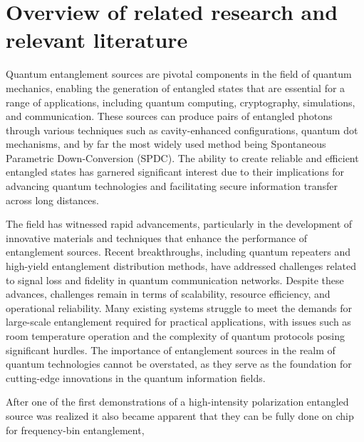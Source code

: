 \documentclass{article}
\theoremstyle{mytheoremstyle}
\theoremstyle{mytheoremstyle}
\theoremstyle{myproblemstyle}
\begin{document}
\section{Overview of related research and relevant literature}
Quantum entanglement sources are pivotal components in the field of quantum mechanics, enabling the generation of entangled states
that are essential for a range of applications, including quantum computing, cryptography, simulations, and communication.
These sources can produce pairs of entangled photons through various techniques such as cavity-enhanced configurations,
quantum dot mechanisms, and by far the most widely used method being Spontaneous Parametric Down-Conversion (SPDC).
The ability to create reliable and efficient entangled states has garnered significant interest due to their
implications for advancing quantum technologies and facilitating secure information transfer across long distances.
\par The field has witnessed rapid advancements, particularly in the development of innovative materials and techniques that enhance the
performance of entanglement sources. Recent breakthroughs, including quantum repeaters and high-yield entanglement distribution methods,
have addressed challenges related to signal loss and fidelity in quantum communication networks.
Despite these advances, challenges remain in terms of scalability, resource efficiency, and operational reliability.
Many existing systems struggle to meet the demands for large-scale entanglement required for practical applications,
with issues such as room temperature operation and the complexity of quantum protocols posing significant hurdles.
The importance of entanglement sources in the realm of quantum technologies cannot be overstated,
as they serve as the foundation for cutting-edge innovations in the quantum information fields.
\par After one of the first \cite{Kwiat_1995} demonstrations of a high-intensity polarization entangled source was realized it also
became apparent that they can be fully done on chip \cite{S_G_S_C_F_B_L_G_B_2022} for frequency-bin entanglement,
\end{document}
